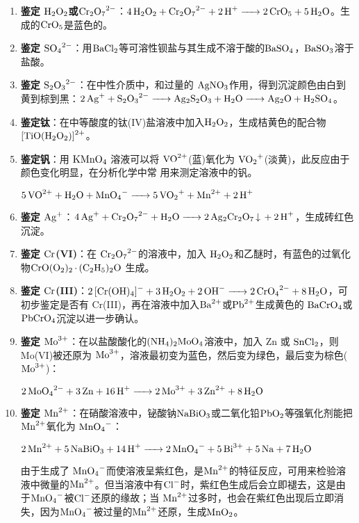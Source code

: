 \documentclass[
  10pt,
  twoside,
  openany,
  b5paper, %
  colorscheme = basic, %
  xits = false,
]{qyxf-book}
\begin{document}
\begin{enumerate}
	\item \textbf{鉴定 $\ce{H2O2}$或$\ce{Cr2O7^2-}$}：$\ce{4H2O2 + Cr2O7^2- + 2H+ -> 2CrO5 + 5H2O}$。生成的$\ce{CrO5}$是蓝色的。
	\item \textbf{鉴定 $\ce{SO4^2-}$}：用$\ce{BaCl2}$等可溶性钡盐与其生成不溶于酸的$\ce{BaSO4}$，$\ce{BaSO3}$溶于盐酸。
	\item \textbf{鉴定 $\ce{S2O3^2-}$}：在中性介质中，和过量的 $\ce{AgNO3}$作用，得到沉淀颜色由白到黄到棕到黑：$\ce{2Ag+ + S2O3^2- -> Ag2S2O3 + H2O -> Ag2O + H2SO4}$。
	\item \textbf{鉴定钛}：在中等酸度的钛(IV)盐溶液中加入$ \ce{H2O2}$，生成桔黄色的配合物$\ce{[TiO(H2O2)]^2+}$。
	\item \textbf{鉴定钒}：用 $\ce{KMnO4}$ 溶液可以将 $\ce{VO^2+}$(蓝)氧化为 $\ce{VO2^+}$(淡黄)，此反应由于颜色变化明显，在分析化学中常
	用来测定溶液中的钒。
	\begin{center}
		$\ce{5VO^2+ + H2O + MnO4- -> 5VO2^+ + Mn^2+ + 2H+}$
	\end{center}
	\item \textbf{鉴定 $\ce{Ag+}$}：$\ce{4Ag+ + Cr2O7^2- + H2O -> 2Ag2Cr2O7 v + 2H+ }$，生成砖红色沉淀。
	\item \textbf{鉴定 $\ce{Cr}$(VI)}：在 $\ce{Cr2O7^2-}$的溶液中，加入 $\ce{H2O2}$和乙醚时，有蓝色的过氧化物$\ce{ CrO(O2)2*(C2H5)2O}$ 生成。
	\item \textbf{鉴定 $\ce{Cr}$(III)}：$\ce{2[Cr(OH)4]^- + 3H2O2 + 2OH- -> 2CrO4^2- + 8H2O}$，可初步鉴定是否有 Cr(III)，再在溶液中加入$\ce{ Ba^2+}$或$\ce{ Pb^2+}$生成黄色的 $\ce{BaCrO4}$或$ \ce{PbCrO4}$沉淀以进一步确认。
	\item \textbf{鉴定 $\ce{Mo^3+}$}：在以盐酸酸化的$\ce{(NH4)2MoO4}$溶液中，加入 Zn 或 $\ce{SnCl2}$，则 Mo(VI)被还原为 $\ce{Mo^3+}$，溶液最初变为蓝色，然后变为绿色，最后变为棕色( $\ce{Mo^3+}$)：
	\begin{center}
		$\ce{2MoO4^2- + 3Zn + 16H+ -> 2Mo^3+ + 3Zn^2+ + 8H2O}$
	\end{center}
	\item \textbf{鉴定 $\ce{Mn^2+}$}：在硝酸溶液中，铋酸钠$\ce{NaBiO3}$或二氧化铅$\ce{PbO2}$等强氧化剂能把 $\ce{Mn^2+}$氧化为 $\ce{MnO4^-}$：
	\begin{center}
		$\ce{2Mn^2+ + 5NaBiO3 + 14H+ -> 2MnO4^- + 5Bi^3+ + 5Na + 7H2O}$
	\end{center}
	由于生成了 $\ce{MnO4-}$而使溶液呈紫红色，是$\ce{Mn^2+}$的特征反应，可用来检验溶液中微量的$\ce{Mn^2+}$。但当溶液中有$\ce{Cl-}$时，紫红色生成后会立即褪去，这是由于$\ce{MnO4-}$被$\ce{Cl-}$还原的缘故；当 $\ce{Mn^2+}$过多时，也会在紫红色出现后立即消失，因为$\ce{MnO4-}$被过量的$\ce{Mn^2+}$还原，生成$ \ce{MnO2}$。

\end{enumerate}
\end{document}
